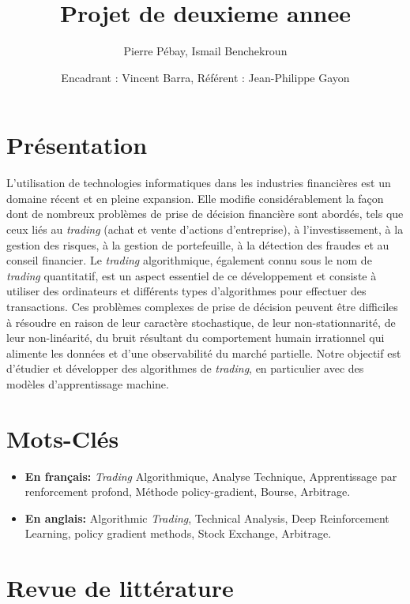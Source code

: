 \documentclass[twocolumn]{article}
\title{Projet de deuxieme annee}
\author{Pierre P\'ebay, Ismail Benchekroun \and Encadrant : Vincent Barra, R\'ef\'erent : Jean-Philippe Gayon}
\begin{document}
\maketitle

\twocolumn

\section{Pr\'esentation}

L'utilisation de technologies informatiques dans les industries financières est un domaine r\'ecent et en pleine expansion. Elle modifie considérablement la façon dont de nombreux problèmes de prise de décision financière sont abordés, tels que ceux liés au \textit{trading} (achat et vente d'actions d'entreprise), à l'investissement, à la gestion des risques, à la gestion de portefeuille, à la détection des fraudes et au conseil financier. Le \textit{trading} algorithmique, également connu sous le nom de \textit{trading} quantitatif, est un aspect essentiel de ce d\'eveloppement et consiste à utiliser des ordinateurs et diff\'erents types d'algorithmes pour effectuer des transactions. Ces problèmes complexes de prise de décision peuvent être difficiles à résoudre en raison de leur caractère stochastique, de leur non-stationnarité, de leur non-linéarité, du bruit résultant du comportement humain irrationnel qui alimente les données et d'une observabilité du march\'e partielle. Notre objectif est d'\'etudier et d\'evelopper des algorithmes de \textit{trading}, en particulier avec des mod\`eles d'apprentissage machine.

\section{Mots-Cl\'es}


\begin{itemize}
    \item \textbf{En fran\c{c}ais:} \textit{Trading} Algorithmique, Analyse Technique, Apprentissage par renforcement profond,  Méthode policy-gradient, Bourse, Arbitrage.

    \item \textbf{En anglais:} Algorithmic \textit{Trading}, Technical Analysis, Deep Reinforcement Learning, policy gradient methods, Stock Exchange, Arbitrage.
\end{itemize}


\section{Revue de littérature}
\end{document}

